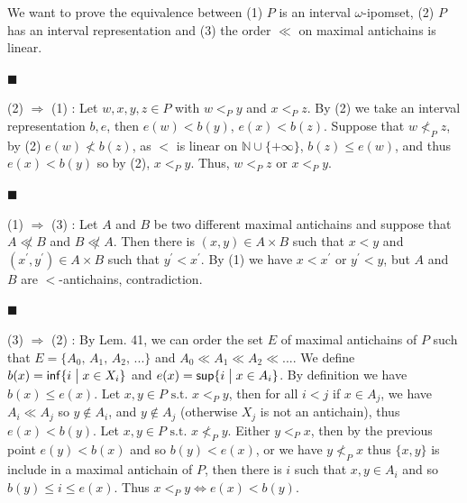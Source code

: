  
We want to prove the equivalence between (1) $P$ is an interval $\omega$-ipomset, (2) $P$ has an interval representation and (3) the order $\ll$ on maximal antichains is linear.\par
  
\par\noindent  $\blacksquare$ 
 
(2) $\Rightarrow$ (1) : Let $w,x,y,z\in P$ with $w<_{P}y$ and $x<_{P}z$. By (2) we take an interval representation $b,e$, then $e(w)<b(y)$, $e(x)<b(z)$. Suppose that $w\nless_{P}z$, by (2) $e(w)\nless b(z)$, as $<$ is linear on $\mathbb{N}\cup{\{+\infty\}}$, $b(z)\leqslant e(w)$, and thus $e(x)<b(y)$ so by (2), $x<_{P}y$. Thus, $w<_{P}z$ or $x<_{P}y$.\par
 
 
 
\par\noindent  $\blacksquare$ 
 
(1) $\Rightarrow$ (3) : Let $A$ and $B$ be two different maximal antichains and suppose that $A\not\ll B$ and $B\not\ll A$. Then there is $(x,y)\in A\times B$ such that $x<y$ and $(x^{\prime},y^{\prime})\in A\times B$ such that $y^{\prime}<x^{\prime}$. By (1) we have $x<x^{\prime}$ or $y^{\prime}<y$, but $A$ and $B$ are $<$-antichains, contradiction.\par
 
 
 
\par\noindent  $\blacksquare$ 
 
(3) $\Rightarrow$ (2) : By Lem. 41, we can order the set $E$ of maximal antichains of $P$ such that $E={\{A_{0},\,A_{1},\,A_{2},\,...\}}$ and $A_{0}\ll A_{1}\ll A_{2}\ll...$. We define $b(x)=\mathsf{inf}{\{i\mathrel{\big{|}}x\in X_{i}\}}$ and $e(x)=\mathsf{sup}{\{i\mathrel{\big{|}}x\in A_{i}\}}$. By definition we have $b(x)\leqslant e(x)$. Let $x,y\in P\text{ s.t.\ }x<_{P}y$, then for all $i<j$ if $x\in A_{j}$, we have $A_{i}\ll A_{j}$ so $y\not\in A_{i}$, and $y\not\in A_{j}$ (otherwise $X_{j}$ is not an antichain), thus $e(x)<b(y)$. Let $x,y\in P\text{ s.t.\ }x\not<_{P}y$. Either $y<_{P}x$, then by the previous point $e(y)<b(x)$ and so $b(y)<e(x)$, or we have $y\not<_{P}x$ thus ${\{x,y\}}$ is include in a maximal antichain of $P$, then there is $i$ such that $x,y\in A_{i}$ and so $b(y)\leqslant i\leqslant e(x)$. Thus $x<_{P}y\Leftrightarrow e(x)<b(y)$.\par
 
